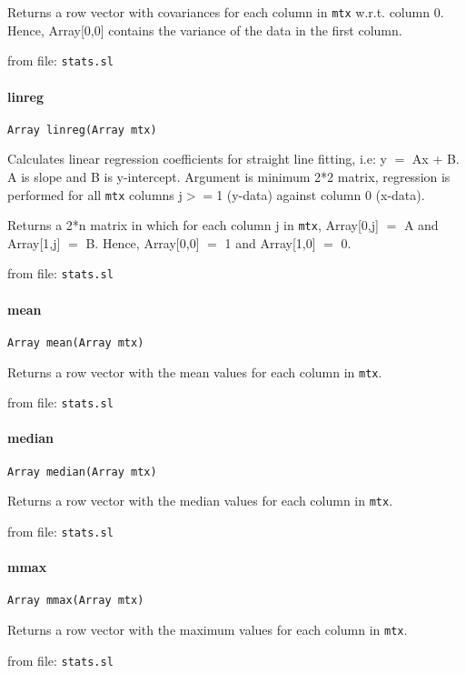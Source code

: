 Returns a row vector with covariances for each column in {\tt mtx}
w.r.t. column 0. Hence, Array[0,0] contains the variance of the
data in the first column.

from file: {\tt stats.sl}


\paragraph{linreg}
\begin{verbatim}
Array linreg(Array mtx)
\end{verbatim}
Calculates linear regression coefficients for straight line
fitting, i.e: y $=$ Ax + B. A is slope and B is y-intercept.
Argument is minimum 2*2 matrix, regression is performed for
all {\tt mtx} columns j$>$$=$1 (y-data) against column 0 (x-data).


Returns a 2*n matrix in which for each column j in {\tt mtx},
Array[0,j] $=$ A and Array[1,j] $=$ B. Hence, Array[0,0] $=$ 1 and
Array[1,0] $=$ 0.

from file: {\tt stats.sl}


\paragraph{mean}
\begin{verbatim}
Array mean(Array mtx)
\end{verbatim}
Returns a row vector with the mean values for each column
in {\tt mtx}.

from file: {\tt stats.sl}


\paragraph{median}
\begin{verbatim}
Array median(Array mtx)
\end{verbatim}
Returns a row vector with the median values for each column
in {\tt mtx}.

from file: {\tt stats.sl}


\paragraph{mmax}
\begin{verbatim}
Array mmax(Array mtx)
\end{verbatim}
Returns a row vector with the maximum values for each column
in {\tt mtx}.

from file: {\tt stats.sl}


